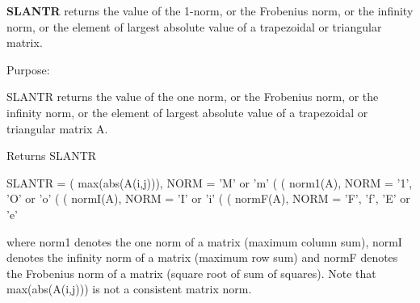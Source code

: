 {\bfseries S\+L\+A\+N\+T\+R} returns the value of the 1-\/norm, or the Frobenius norm, or the infinity norm, or the element of largest absolute value of a trapezoidal or triangular matrix. 

 \begin{DoxyParagraph}{Purpose\+: }
\begin{DoxyVerb} SLANTR  returns the value of the one norm,  or the Frobenius norm, or
 the  infinity norm,  or the  element of  largest absolute value  of a
 trapezoidal or triangular matrix A.\end{DoxyVerb}

\end{DoxyParagraph}
\begin{DoxyReturn}{Returns}
S\+L\+A\+N\+T\+R \begin{DoxyVerb}    SLANTR = ( max(abs(A(i,j))), NORM = 'M' or 'm'
             (
             ( norm1(A),         NORM = '1', 'O' or 'o'
             (
             ( normI(A),         NORM = 'I' or 'i'
             (
             ( normF(A),         NORM = 'F', 'f', 'E' or 'e'

 where  norm1  denotes the  one norm of a matrix (maximum column sum),
 normI  denotes the  infinity norm  of a matrix  (maximum row sum) and
 normF  denotes the  Frobenius norm of a matrix (square root of sum of
 squares).  Note that  max(abs(A(i,j)))  is not a consistent matrix norm.\end{DoxyVerb}
 
\end{DoxyReturn}

